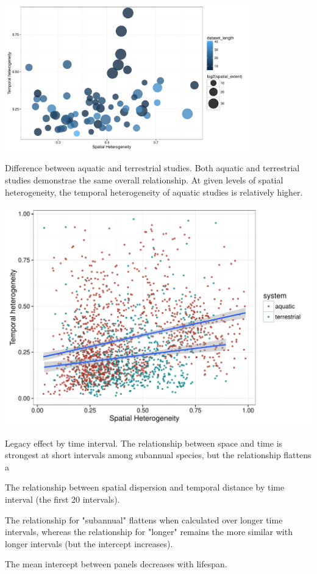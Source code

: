 \documentclass[11pt]{article}
\begin{document}
\includegraphics[width=400px]{overallagg}

Difference between aquatic and terrestrial studies. Both aquatic and terrestrial studies demonstrae the same overall relationship. At given levels of spatial heterogeneity, the temporal heterogeneity of aquatic studies is relatively higher.

\includegraphics[scale = 0.7]{aqterr}


Legacy effect by time interval. The relationship between space and time is strongest at short intervals among subannual species, but the relationship flattens a

The relationship between spatial dispersion and temporal distance by time interval (the first 20 intervals). 

The relationship for "subannual" flattens when calculated over longer time intervals, whereas the relationship for "longer" remains the more similar with longer intervals (but the intercept increases). 

The mean intercept between panels decreases with lifespan. 
\end{document}
